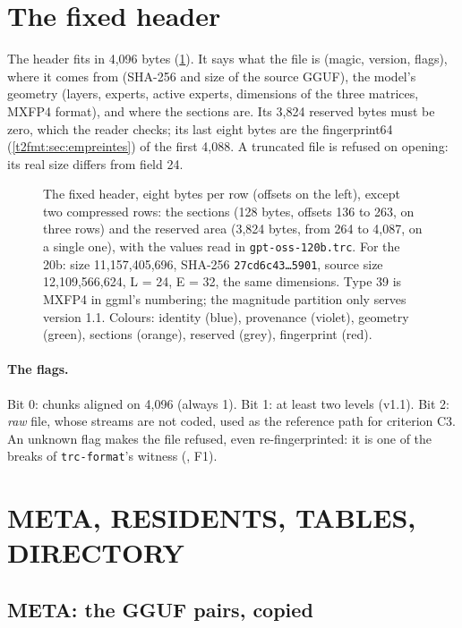 \section{The fixed header}\label{t2fmt:sec:entete}

The header fits in 4{,}096 bytes (\cref{t2fmt:fig:entete}). It says what the file is (magic, version, flags), where it comes from (SHA-256 and size of the source GGUF), the model's geometry (layers, experts, active experts, dimensions of the three matrices, MXFP4 format), and where the sections are. Its 3{,}824 reserved bytes must be zero, which the reader checks; its last eight bytes are the fingerprint64 (\cref{t2fmt:sec:empreintes}) of the first 4{,}088. A truncated file is refused on opening: its real size differs from field 24.

\begin{figure}[p]
\centering
\TdFmtEntete
\caption[The fixed header, byte by byte]{The fixed header, eight bytes per row (offsets on the left), except two compressed rows: the sections (128 bytes, offsets 136 to 263, on three rows) and the reserved area (3{,}824 bytes, from 264 to 4{,}087, on a single one), with the values read in \texttt{gpt-oss-120b.trc}. For the 20b: size 11{,}157{,}405{,}696, SHA-256 \texttt{27cd6c43…5901}, source size 12{,}109{,}566{,}624, L = 24, E = 32, the same dimensions. Type 39 is MXFP4 in ggml's numbering; the magnitude partition only serves version 1.1. Colours: identity (blue), provenance (violet), geometry (green), sections (orange), reserved (grey), fingerprint (red).}
\label{t2fmt:fig:entete}
\end{figure}

\paragraph{The flags.} Bit 0: chunks aligned on 4{,}096 (always 1). Bit 1: at least two levels (v1.1). Bit 2: \emph{raw} file, whose streams are not coded, used as the reference path for criterion C3. An unknown flag makes the file refused, even re-fingerprinted: it is one of the breaks of \texttt{trc-format}'s witness (, F1).

\section{META, RESIDENTS, TABLES, DIRECTORY}\label{t2fmt:sec:sections}

\subsection{META: the GGUF pairs, copied}

